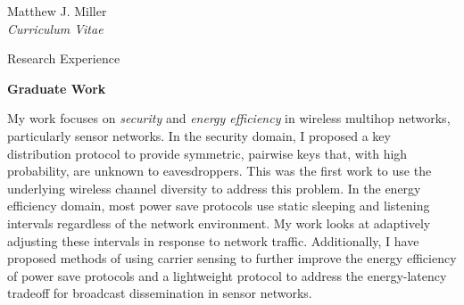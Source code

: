 \documentclass[10pt]{article}
\newenvironment{sublist}{%
	\begin{list}{}{%
		\setlength{\itemsep}{0em}\setlength{\parsep}{0em}%
		\setlength{\topsep}{0em}\setlength{\parskip}{0em}%
	}%
}%
{ \end{list} }
\begin{document}
\begin{cv}{Matthew J. Miller\\{\large \itshape Curriculum Vitae}}
\setlength{\oldcvlabelwidth}{\cvlabelwidth}
\setlength{\cvlabelwidth}{1em}
\begin{cvlist}{Research Experience}
	\item \textbf{Graduate Work}
	\begin{sublist}
		\item 
		My work focuses on \textit{security} and \textit{energy efficiency}
		in wireless
		multihop networks, particularly sensor networks.  In the
		security domain, I proposed a key distribution protocol to
		provide symmetric, pairwise keys that, with high
		probability, are unknown to eavesdroppers.  This was the first
		work to use the underlying wireless channel diversity
		to address this problem.  In the energy efficiency domain, most
		power save protocols use static sleeping and listening intervals
		regardless of the network environment.  My work looks at
		adaptively adjusting these intervals in response to
		network traffic.  Additionally, I have proposed methods of using
		carrier sensing to further improve the energy efficiency of
		power save protocols and a lightweight protocol to address the
		energy-latency tradeoff for broadcast dissemination in sensor
		networks.
	\end{sublist}


\end{cvlist}
\end{cv}
\end{document}
